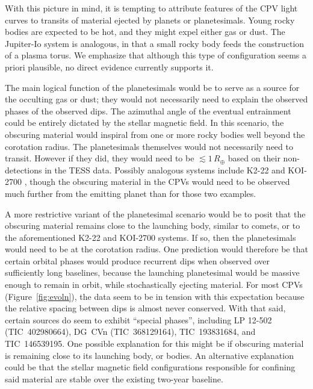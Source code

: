 \documentclass[11pt,twocolumn,tighten]{aastex63}
\begin{document}
With this picture in mind, it is tempting to attribute features of the
CPV light curves to transits of material ejected by planets or
planetesimals.  Young rocky bodies are expected to be hot, and they
might expel either gas or dust.  The Jupiter-Io system
\citep[e.g.][]{2004jpsm.book..537S} is analogous, in that a small
rocky body feeds the construction of a plasma torus.  We emphasize
that although this type of configuration seems a priori plausible, no
direct evidence currently supports it.

The main logical function of the planetesimals would be to serve as a
source for the occulting gas or dust; they would not necessarily need
to explain the observed phases of the observed dips.  The azimuthal
angle of the eventual entrainment could be entirely dictated by the
stellar magnetic field.  In this scenario, the obscuring material
would inspiral from one or more rocky bodies well beyond the
corotation radius.  The planetesimals themselves would not necessarily
need to transit.  However if they did, they would need to be $\lesssim
1$\,$R_\oplus$ based on their non-detections in the TESS data.
Possibly analogous systems include K2-22 \citep{2015ApJ...812..112S}
and KOI-2700 \citep{2014ApJ...784...40R}, though the obscuring
material in the CPVs would need to be observed much further from the
emitting planet than for those two examples.  

A more restrictive variant of the planetesimal scenario would be to
posit that the obscuring material remains close to the launching body,
similar to comets, or to the aforementioned K2-22 and KOI-2700
systems.  If so, then the planetesimals would need to be at the
corotation radius.  One prediction would therefore be that certain
orbital phases would produce recurrent dips when observed over
sufficiently long baselines, because the launching planetesimal would
be massive enough to remain in orbit, while stochastically ejecting
material.  For most CPVs (Figure~\ref{fig:evoln}), the data seem to be
in tension with this expectation because the relative spacing between
dips is almost never conserved.  With that said, certain sources do
seem to exhibit ``special phases'', including LP 12-502
(TIC~402980664), DG~CVn (TIC~368129164), TIC~193831684, and
TIC~146539195.  One possible explanation for this might be if
obscuring material is remaining close to its launching body, or
bodies.  An alternative explanation could be that the stellar magnetic
field configurations responsible for confining said material are
stable over the existing two-year baseline.
\end{document}
